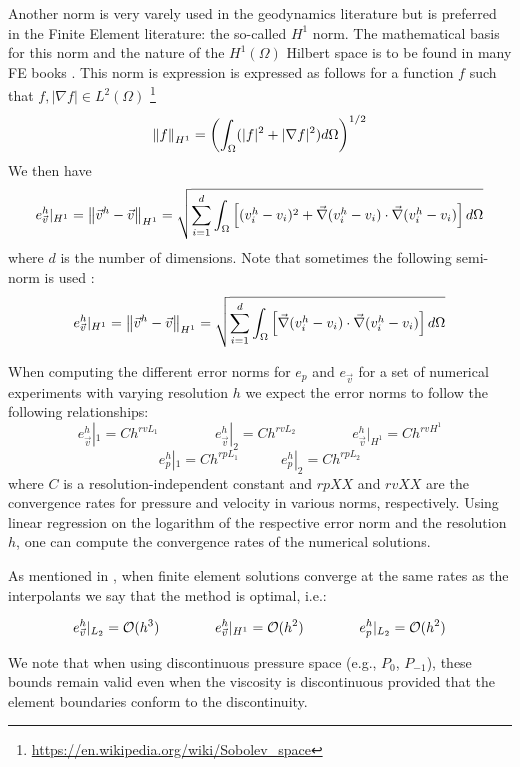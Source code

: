   
Another norm is very varely used in the geodynamics literature but is preferred in the 
Finite Element literature: the so-called $H^1$ norm. The mathematical basis for this
norm and the nature of the $H^1(\Omega)$ Hilbert space is to be found in many FE books \cite{dohu03,john16,hugh}.
This norm is expression is expressed as follows for a function $f$ such that $f,|\nabla f|\in L^2(\Omega)$
\footnote{\url{https://en.wikipedia.org/wiki/Sobolev_space}}
\[
\left\lVert f\right\rVert_{H^1} = \left( \int_\Omega ( |f|^2 + |\nabla f|^2  ) d\Omega   \right)^{1/2}
\]
We then have 
\[
e_{\vec v}^h|_{H^1} = \left\lVert\vec{v}^h-\vec{v}\right\rVert_{H^1} = \sqrt{
\sum\limits_{i=1}^d 
\int_\Omega  
\left[
({v}_i^h-{v}_i)^2
+
\vec\nabla(v_i^h-v_i)\cdot\vec\nabla(v_i^h-v_i) 
\right] d\Omega   
}
\]
where $d$ is the number of dimensions.
Note that sometimes the following semi-norm is used \cite{dobo04,bodg06}:
\[
e_{\vec v}^h|_{H^1} = \left\lVert\vec{v}^h-\vec{v}\right\rVert_{H^1} = \sqrt{
\sum\limits_{i=1}^d 
\int_\Omega  
\left[
\vec\nabla(v_i^h-v_i)\cdot\vec\nabla(v_i^h-v_i) 
\right] d\Omega   
}
\]
 

When computing the different error norms for $e_p$ and $e_{\vec v}$ for a set of numerical experiments with
varying resolution $h$ we expect the error norms to follow the following relationships:
\[
e_{\vec v}^h|_1 = C h^{rvL_1} 
\quad\quad\quad\quad
e_{\vec v}^h|_2 = C h^{rvL_2} 
\quad\quad\quad\quad 
e_{\vec v}^h|_{H^1} = C h^{rvH^1}
\]
\[
e_p^h|_1 = C h^{rpL_1} 
\quad\quad\quad 
e_p^h|_2 = C h^{rpL_2}
\]
where $C$ is a resolution-independent constant
and $rpXX$ and $rvXX$ are the convergence rates for
pressure and velocity in various norms, respectively. 
Using linear regression on the logarithm of the respective error norm and the resolution $h$,
one can compute the convergence rates of the numerical solutions.

As mentioned in \cite{dobo04}, when finite element solutions converge at
the same rates as the interpolants we say that the method is optimal, i.e.:

\[
e_{\vec v}^h|_{L_2} = {\cal O}(h^3)
\quad\quad\quad\quad
e_{\vec v}^h|_{H^1} = {\cal O}(h^2)
\quad\quad\quad\quad
e_{p}^h|_{L_2} = {\cal O}(h^2)
\]

We note that when using discontinuous pressure space
(e.g., $P_0$, $P_{-1}$), these bounds remain valid even
when the viscosity is discontinuous provided that the element boundaries conform to the discontinuity.


